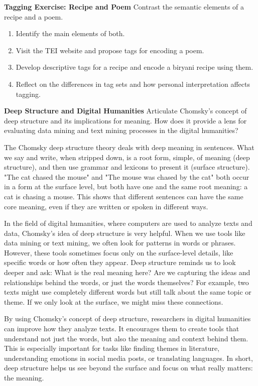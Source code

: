 \documentclass[a4paper]{exam}
\begin{document}
\begin{questions}
\vspace{10cm}

\question[20] \textbf{Tagging Exercise: Recipe and Poem} Contrast the semantic elements of a recipe and a poem. 
\begin{enumerate}
    \item Identify the main elements of both.
    \item Visit the TEI website and propose tags for encoding a poem.
    \item Develop descriptive tags for a recipe and encode a biryani recipe using them.
    \item Reflect on the differences in tag sets and how personal interpretation affects tagging.
\end{enumerate}

\vspace{12cm}

\question[10] \textbf{Deep Structure and Digital Humanities} Articulate Chomsky’s concept of deep structure and its implications for meaning. How does it provide a lens for evaluating data mining and text mining processes in the digital humanities?


The Chomsky deep structure theory deals with deep meaning in sentences. What we say and write, when stripped down, is a root form, simple, of meaning (deep structure), and then use grammar and lexicons to present it (surface structure). "The cat chased the mouse" and "The mouse was chased by the cat" both occur in a form at the surface level, but both have one and the same root meaning: a cat is chasing a mouse. This shows that different sentences can have the same core meaning, even if they are written or spoken in different ways.

In the field of digital humanities, where computers are used to analyze texts and data, Chomsky’s idea of deep structure is very helpful. When we use tools like data mining or text mining, we often look for patterns in words or phrases. However, these tools sometimes focus only on the surface-level details, like specific words or how often they appear. Deep structure reminds us to look deeper and ask: What is the real meaning here? Are we capturing the ideas and relationships behind the words, or just the words themselves? For example, two texts might use completely different words but still talk about the same topic or theme. If we only look at the surface, we might miss these connections.

By using Chomsky’s concept of deep structure, researchers in digital humanities can improve how they analyze texts. It encourages them to create tools that understand not just the words, but also the meaning and context behind them. This is especially important for tasks like finding themes in literature, understanding emotions in social media posts, or translating languages. In short, deep structure helps us see beyond the surface and focus on what really matters: the meaning.


\end{questions}
\end{document}

